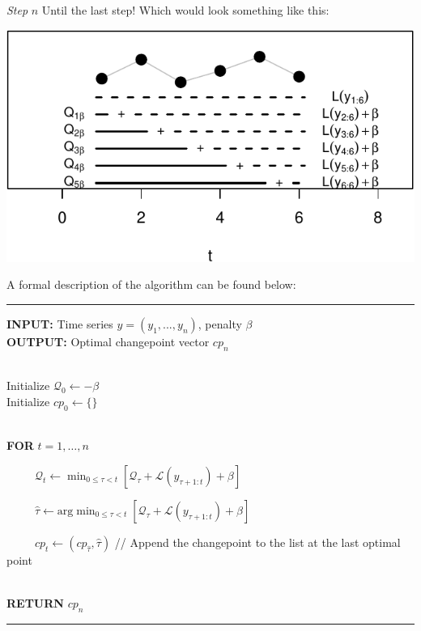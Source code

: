 \documentclass[
  letterpaper,
  DIV=11,
  numbers=noendperiod]{scrreprt}
\begin{document}
\emph{Step} \(n\) Until the last step! Which would look something like
this:

\includegraphics{3_multiple_changes_files/figure-pdf/unnamed-chunk-15-1.pdf}

A formal description of the algorithm can be found below:

\begin{center}\rule{0.5\linewidth}{0.5pt}\end{center}

\textbf{INPUT:} Time series \(y = (y_1, ..., y_n)\), penalty \(\beta\)\\
\textbf{OUTPUT:} Optimal changepoint vector \(cp_n\)\\
\strut \\
Initialize \(\mathcal{Q}_0 \leftarrow -\beta\)\\
Initialize \(cp_0 \leftarrow \{\}\)\\
\strut \\
\textbf{FOR} \(t = 1, \dots, n\)\\
\strut ~~~~~\(\mathcal{Q}_t \leftarrow \min_{0 \leq \tau < t} \left[ \mathcal{Q}_{\tau} + \mathcal{L}(y_{\tau + 1:t}) + \beta \right]\)\\
\strut ~~~~~\(\hat\tau \leftarrow \text{arg}\min_{0 \leq \tau < t} \left[ \mathcal{Q}_{\tau} + \mathcal{L}(y_{\tau + 1:t}) + \beta \right]\)\\
\strut ~~~~~\(cp_t \leftarrow (cp_{\hat\tau}, \hat\tau)\) // Append the
changepoint to the list at the last optimal point\\
\strut \\
\textbf{RETURN} \(cp_n\)

\begin{center}\rule{0.5\linewidth}{0.5pt}\end{center}
\end{document}
